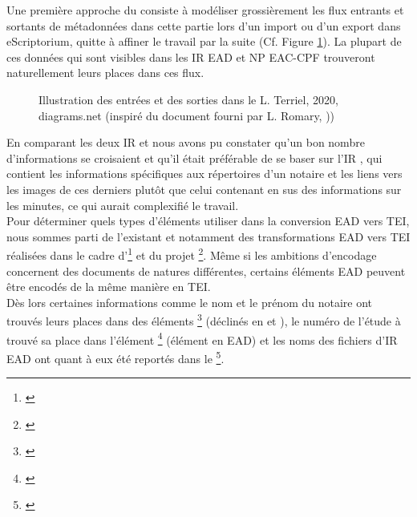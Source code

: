 Une première approche du  consiste à modéliser grossièrement les flux entrants et sortants de métadonnées dans cette partie lors d'un import ou d'un export dans eScriptorium, quitte à affiner le travail par la suite (Cf. Figure \ref{fig:flux_teiheader}). La plupart de ces données qui sont visibles dans les IR EAD et NP EAC-CPF trouveront naturellement leurs places dans ces flux.

\begin{figure}[h]
    \centering
    \centerline{}
    \caption{Illustration des entrées et des sorties dans le  \textcopyright L. Terriel, 2020, diagrams.net (inspiré du document fourni par L. Romary, ))}
    \label{fig:flux_teiheader}
\end{figure}

\newpage
En comparant les deux IR  et  nous avons pu constater qu'un bon nombre d'informations se croisaient et qu'il était préférable de se baser sur l'IR , qui contient les informations spécifiques aux répertoires d'un notaire et les liens vers les images de ces derniers plutôt que celui contenant en sus des informations sur les minutes, ce qui aurait complexifié le travail.\\

Pour déterminer quels types d'éléments utiliser dans la conversion EAD vers TEI, nous sommes parti de l'existant et notamment des transformations EAD vers TEI réalisées dans le cadre d'\footnote{\cite{stutzmann_ead-tei_2019}} et du projet \footnote{\cite{university_of_oxford_-__bodleian_library_ead2enrich_nodate}}. Même si les ambitions d'encodage concernent des documents de natures différentes, certains éléments EAD peuvent être encodés de la même manière en TEI.\\

Dès lors certaines informations comme le nom et le prénom du notaire ont trouvés leurs places dans des éléments \footnote{\cite{tei_tei_nodate-9}} (déclinés en  et ), le numéro de l'étude à trouvé sa place dans l'élément \footnote{\cite{tei_tei_nodate-8}} (élément  en EAD) et les noms des fichiers d'IR EAD ont quant à eux été reportés dans le \footnote{\cite{tei_tei_nodate-7}}.\\

